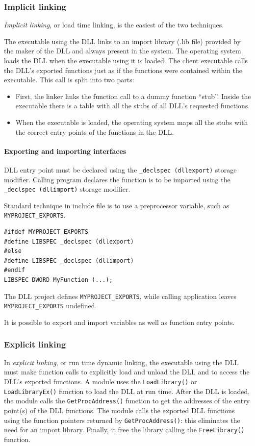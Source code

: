 \subsubsection{Implicit linking}
\emph{Implicit linking}, or load time linking, is the easiest of the two techniques.

The executable using the DLL links to an import library (.lib file) provided by the maker of the DLL and always present in the system. The operating system loads the DLL when the executable using it is loaded. The client executable calls the DLL’s exported functions just as if the functions were contained within the executable. This call is split into two parts:
\begin{itemize}
\item First, the linker links the function call to a dummy function ``stub''. Inside the executable there is a table with all the stubs of all DLL’s requested functions.
\item When the executable is loaded, the operating system maps all the stubs with the correct
entry points of the functions in the DLL.
\end{itemize}

\paragraph{Exporting and importing interfaces}
DLL entry point must be declared using the \texttt{\_declspec (dllexport)} storage modifier. Calling program declares the function is to be imported using the \texttt{\_declspec (dllimport)} storage modifier.

Standard technique in include file is to use a preprocessor variable, such as \texttt{MYPROJECT\_EXPORTS}.
\begin{verbatim}
#ifdef MYPROJECT_EXPORTS
#define LIBSPEC _declspec (dllexport)
#else
#define LIBSPEC _declspec (dllimport)
#endif
LIBSPEC DWORD MyFunction (...);
\end{verbatim}
The DLL project defines \texttt{MYPROJECT\_EXPORTS}, while calling application leaves \texttt{MYPROJECT\_EXPORTS} undefined.

It is possible to export and import variables as well as function entry points. 

\subsubsection{Explicit linking}
In \emph{explicit linking}, or run time dynamic linking, the executable using the DLL must make function calls to explicitly load and unload the DLL and to access the DLL’s exported functions. A module uses the \texttt{LoadLibrary()} or \texttt{LoadLibraryEx()} function to load the DLL at run time. After the DLL is loaded, the module calls the \texttt{GetProcAddress()} function to get the addresses of the entry point(s) of the DLL functions. The module calls the exported DLL functions using the function pointers returned by \texttt{GetProcAddress()}: this eliminates the need for an import library. Finally, it free the library calling the \texttt{FreeLibrary()} function.

